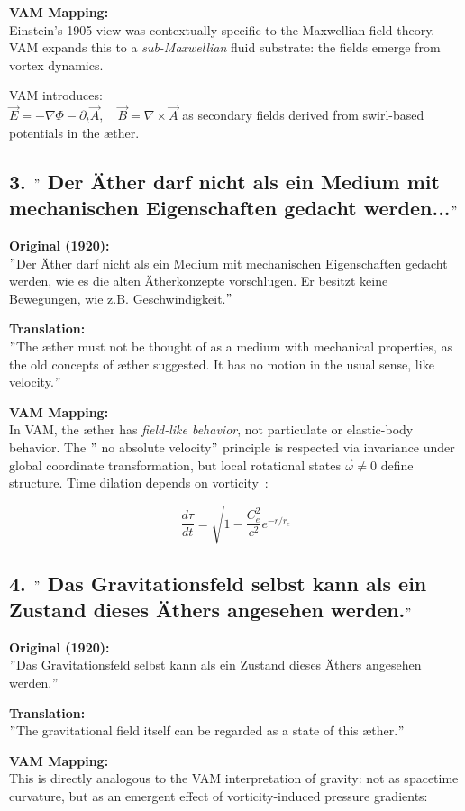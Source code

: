 \textbf{VAM Mapping:} \\
Einstein's 1905 view was contextually specific to the Maxwellian field theory. VAM expands this to a \emph{sub-Maxwellian} fluid substrate: the fields emerge from vortex dynamics.

VAM introduces: \\
\( \vec{E} = -\nabla \Phi - \partial_t \vec{A}, \quad \vec{B} = \nabla \times \vec{A} \) as secondary fields derived from swirl-based potentials in the æther.

\subsection*{3. \("\) Der Äther darf nicht als ein Medium mit mechanischen Eigenschaften gedacht werden...\("\)}
\textbf{Original (1920):} \\
\("\)Der Äther darf nicht als ein Medium mit mechanischen Eigenschaften gedacht werden, wie es die alten Ätherkonzepte vorschlugen. Er besitzt keine Bewegungen, wie z.B. Geschwindigkeit.\("\)

\textbf{Translation:} \\
\("\)The æther must not be thought of as a medium with mechanical properties, as the old concepts of æther suggested. It has no motion in the usual sense, like velocity.\("\)

\textbf{VAM Mapping:} \\
In VAM, the æther has \emph{field-like behavior}, not particulate or elastic-body behavior. The \("\) no absolute velocity\("\) principle is respected via invariance under global coordinate transformation, but local rotational states \( \vec{\omega} \neq 0 \) define structure. Time dilation depends on vorticity~\cite{VAM-2}:

\[
\frac{d\tau}{dt} = \sqrt{1 - \frac{C_e^2}{c^2} e^{-r/r_c}}
\]

\subsection*{4. \("\) Das Gravitationsfeld selbst kann als ein Zustand dieses Äthers angesehen werden.\("\)}
\textbf{Original (1920):} \\
\("\)Das Gravitationsfeld selbst kann als ein Zustand dieses Äthers angesehen werden.\("\)

\textbf{Translation:} \\
\("\)The gravitational field itself can be regarded as a state of this æther.\("\)

\textbf{VAM Mapping:} \\
This is directly analogous to the VAM interpretation of gravity: not as spacetime curvature, but as an emergent effect of vorticity-induced pressure gradients:

